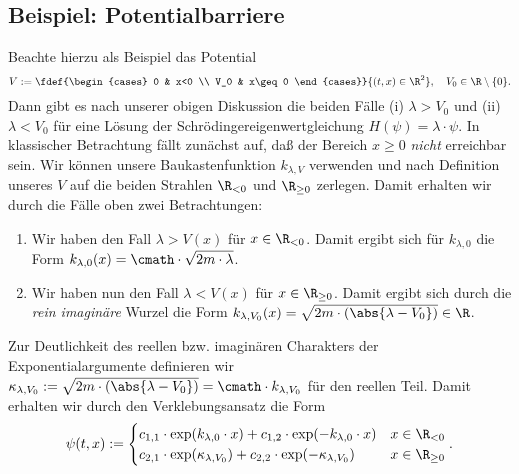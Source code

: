 \documentclass{subfiles}
\begin{document}
    \subsection{Beispiel: Potentialbarriere}
        Beachte hierzu als Beispiel das Potential 
        \[V:=\fdef{\begin{cases}
            0 & x<0 \\
            V_0 & x\geq 0
        \end{cases}}{(t,x)\in\R^2},\quad V_0\in\R\setminus\{0\}.\]
        Dann gibt es nach unserer obigen Diskussion die beiden Fälle (i) $\lambda > V_0$ und (ii) $\lambda < V_0$ für eine Lösung der Schrödingereigenwertgleichung $H(\psi) = \lambda\cdot\psi$. In klassischer Betrachtung fällt zunächst auf, daß der Bereich $x\geq 0$ \emph{nicht} erreichbar sein. 
        Wir können unsere Baukastenfunktion $k_{\lambda,V}$ verwenden und nach Definition unseres $V$ auf die beiden Strahlen $\R_{<0}$ und $\R_{\geq 0}$ zerlegen. Damit erhalten wir durch die Fälle oben zwei Betrachtungen:
        \begin{enumerate}[label=(\roman*)]
            \item Wir haben den Fall $\lambda > V(x)$ für $x\in\R_{<0}$. Damit ergibt sich für $k_{\lambda,0}$ die Form $k_{\lambda,0}(x) = \cmath\cdot\sqrt{2m\cdot\lambda}$. 
            \item Wir haben nun den Fall $\lambda < V(x)$ für $x\in\R_{\geq 0}$. Damit ergibt sich durch die \emph{rein imaginäre} Wurzel die Form $k_{\lambda,V_0}(x) = \sqrt{2m\cdot(\abs{\lambda - V_0})}\in\R$.
        \end{enumerate}
        Zur Deutlichkeit des reellen bzw. imaginären Charakters der Exponentialargumente definieren wir $\kappa_{\lambda,V_0}:=\sqrt{2m\cdot(\abs{\lambda - V_0})} = \cmath\cdot k_{\lambda,V_0}$ für den reellen Teil. Damit erhalten wir durch den Verklebungsansatz die Form 
        \[
            \psi(t,x) := \begin{cases}
                c_{1,1} \cdot\exp(k_{\lambda,0}\cdot x) + c_{1,2}\cdot\exp(-k_{\lambda,0}\cdot x) & x \in \R_{<0} \\
                c_{2,1} \cdot\exp(\kappa_{\lambda,V_0}) + c_{2,2}\cdot\exp(-\kappa_{\lambda,V_0}) & x \in \R_{\geq 0}
            \end{cases}.
        \]
\end{document}
